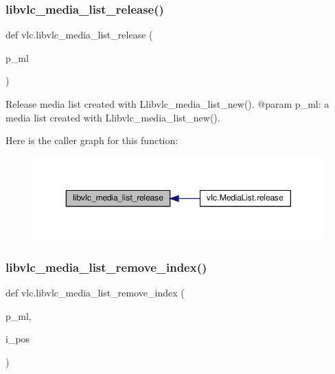 \subsubsection{\texorpdfstring{libvlc\+\_\+media\+\_\+list\+\_\+release()}{libvlc\_media\_list\_release()}}
{\footnotesize\ttfamily def vlc.\+libvlc\+\_\+media\+\_\+list\+\_\+release (\begin{DoxyParamCaption}\item[{}]{p\+\_\+ml }\end{DoxyParamCaption})}

\begin{DoxyVerb}Release media list created with L{libvlc_media_list_new}().
@param p_ml: a media list created with L{libvlc_media_list_new}().
\end{DoxyVerb}
 Here is the caller graph for this function\+:
\nopagebreak
\begin{figure}[H]
\begin{center}
\leavevmode
\includegraphics[width=350pt]{namespacevlc_a45316f80cd7384457137cf0154c99dd7_icgraph}
\end{center}
\end{figure}
\mbox{\label{namespacevlc_a22579a827e1b9e58c69bac7de72b1ab7}} 
\subsubsection{\texorpdfstring{libvlc\+\_\+media\+\_\+list\+\_\+remove\+\_\+index()}{libvlc\_media\_list\_remove\_index()}}
{\footnotesize\ttfamily def vlc.\+libvlc\+\_\+media\+\_\+list\+\_\+remove\+\_\+index (\begin{DoxyParamCaption}\item[{}]{p\+\_\+ml,  }\item[{}]{i\+\_\+pos }\end{DoxyParamCaption})}

